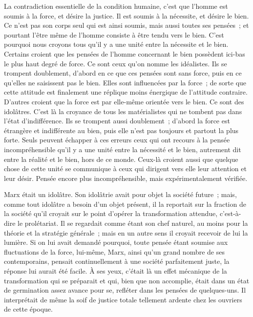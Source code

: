 \documentclass[french,twoside]{book} %
\begin{document}
La contradiction essentielle de la condition humaine, c'est que l'homme est soumis à la force, et désire la justice. Il est soumis à la nécessite, et désire le bien. Ce n'est pas son corps seul qui est ainsi soumis, mais aussi toutes ses pensées ; et pourtant l'être même de l'homme consiste à être tendu vers le bien. C'est pourquoi nous croyons tous qu'il y a une unité entre la nécessite et le bien. Certains croient que les pensées de l'homme concernant le bien possèdent ici-bas le plus haut degré de force. Ce sont ceux qu'on nomme les idéalistes. Ils se trompent doublement, d'abord en ce que ces pensées sont sans force, puis en ce qu'elles ne saisissent pas le bien. Elles sont influencées par la force ; de sorte que cette attitude est finalement une réplique moins énergique de l'attitude contraire. D'autres croient que la force est par elle-même orientée vers le bien. Ce sont des idolâtres. C'est là la croyance de tous les matérialistes qui ne tombent pas dans l'état d'indifférence. Ils se trompent aussi doublement ; d'abord la force est étrangère et indifférente au bien, puis elle n'est pas toujours et partout la plus forte. Seuls peuvent échapper à ces erreurs ceux qui ont recours à la pensée incompréhensible qu'il y a une unité entre la nécessité et le bien, autrement dit entre la réalité et le bien, hors de ce monde. Ceux-là croient aussi que quelque chose de cette unité se communique à ceux qui dirigent vers elle leur attention et leur désir. Pensée encore plus incompréhensible, mais expérimentalement vérifiée.\par
Marx était un idolâtre. Son idolâtrie avait pour objet la société future ; mais, comme tout idolâtre a besoin d'un objet présent, il la reportait sur la fraction de la société qu'il croyait sur le point d'opérer la transformation attendue, c'est-à-dire le prolétariat. Il se regardait comme étant son chef naturel, au moins pour la théorie et la stratégie générale ; mais en un autre sens il croyait recevoir de lui la lumière. Si on lui avait demandé pourquoi, toute pensée étant soumise aux fluctuations de la force, lui-même, Marx, ainsi qu’un grand nombre de ses contemporains, pensait continuellement à une société parfaitement juste, la réponse lui aurait été facile. À ses yeux, c'était là un effet mécanique de la transformation qui se préparait et qui, bien que non accomplie, était dans un état de germination assez avance pour se, refléter dans les pensées de quelques-uns. Il interprétait de même la soif de justice totale tellement ardente chez les ouvriers de cette époque.\par
\end{document}
